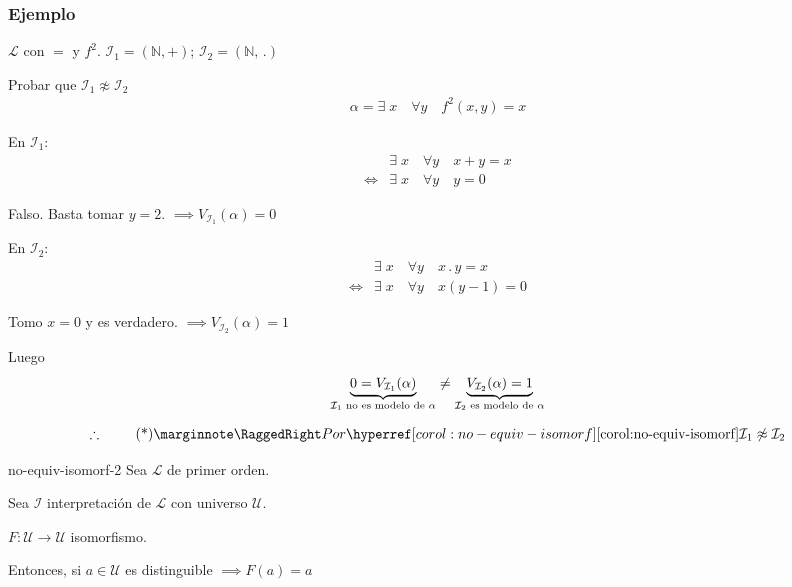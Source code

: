 \subsubsection{Ejemplo}

$\mathcal{L}$ con $=$ y $f^2$. 
$\mathcal{I}_1 = (\mathbb{N}, +)$; $\mathcal{I}_2 = (\mathbb{N}, \, .)$

Probar que $\mathcal{I}_1 \not\approx \mathcal{I}_2$
\begin{gather*}
    \alpha = \exists \; x \quad \forall y \quad f^2 (x,y) = x
\end{gather*}

En $\mathcal{I}_1$:
\begin{align*}
    & \exists \; x \quad \forall y \quad x+y = x \\
    \iff & \exists \; x \quad \forall y \quad y = 0
\end{align*}

Falso. Basta tomar $y = 2$. $\implies V_{\mathcal{I}_1}(\alpha) = 0$

En $\mathcal{I}_2$:
\begin{align*}
    & \exists \; x \quad \forall y \quad x \, . \, y = x \\
    \iff & \exists \; x \quad \forall y \quad x(y-1) = 0
\end{align*}

Tomo $x = 0$ y es verdadero. $\implies V_{\mathcal{I}_2}(\alpha) = 1$

Luego
\begin{gather*}
    \underbrace{0 = V_{\mathcal{I}_1} (\alpha)}_{%
    \mathcal{I}_1 \text{ no es modelo de } \alpha}
    \neq 
    \underbrace{V_{\mathcal{I}_2} (\alpha) = 1}_{%
    \mathcal{I}_2 \text{ es modelo de } \alpha}
\end{gather*}

\begin{gather*}
    \therefore ~ \notamath{Por \fullref{corol:no-equiv-isomorf} }
    \mathcal{I}_1 \not\approx \mathcal{I}_2
\end{gather*}

\medskip

\begin{corolario}{}{no-equiv-isomorf-2}
    Sea $\mathcal{L}$ de primer orden.

    Sea $\mathcal{I}$ interpretación de $\mathcal{L}$ 
    con universo $\mathcal{U}$.

    $F: \mathcal{U} \to \mathcal{U}$ isomorfismo.

    \medskip

    Entonces, si $a \in \mathcal{U}$ es distinguible $\implies F(a) = a$
\end{corolario}


